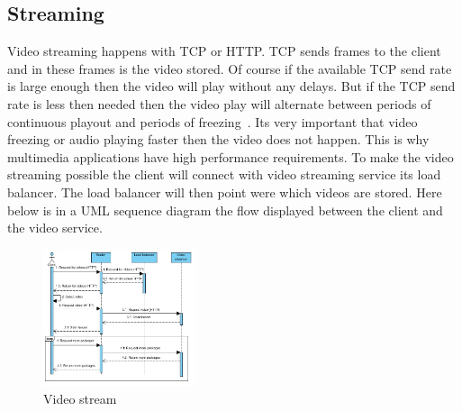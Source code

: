 \documentclass{sig-alternate-br}
\begin{document}
\subsection{Streaming}\label{sec:stream}
Video streaming happens with TCP or HTTP. TCP sends frames to the client and in these frames is the video stored. Of course if the available TCP send rate is large enough then the video will play without any delays. But if the TCP send rate is less then needed then the video play will alternate between periods of continuous playout and periods of freezing~\cite{computer-networking}. Its very important that video freezing or audio playing faster then the video does not happen. This is why multimedia applications have high performance requirements. To make the video streaming possible the client will connect with video streaming service its load balancer. The load balancer will then point were which videos are stored. Here below is in a UML sequence diagram the flow displayed between the client and the video service. 
\begin{figure}[H]
	\centering 
	\includegraphics[width=0.4\textwidth]{VideoStreaming.jpg}
	\caption{Video stream}
	\label{fig:stream} %
\end{figure}
\end{document}
